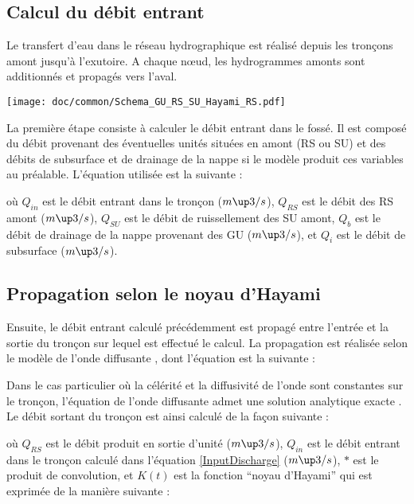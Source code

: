 \subsection{Calcul du débit entrant}
Le transfert d'eau dans le réseau hydrographique est réalisé depuis les tronçons amont jusqu'à l'exutoire. A chaque nœud, les hydrogrammes amonts sont additionnés et propagés vers l’aval.

\texttt{[image: doc/common/Schema\_GU\_RS\_SU\_Hayami\_RS.pdf]}

La première étape consiste à calculer le débit entrant dans le fossé. Il est composé du débit provenant des éventuelles unités situées en amont (RS ou SU) et des débits de subsurface et de drainage de la nappe si le modèle produit ces variables au préalable. L'équation utilisée est la suivante :



où $Q_{in}$ est le débit entrant dans le tronçon ($m\up3/s$), $Q_{RS}$ est le débit des RS amont ($m\up3/s$), $Q_{SU}$ est le débit de ruissellement des SU amont, $Q_b$ est le débit de drainage de la nappe provenant des GU ($m\up3/s$), et $Q_i$ est le débit de subsurface ($m\up3/s$).\\


\subsection{Propagation selon le noyau d'Hayami}
Ensuite, le débit entrant calculé précédemment est propagé entre l'entrée et la sortie du tronçon sur lequel est effectué le calcul. La propagation est réalisée selon le modèle de l'onde diffusante \cite{Moussa1997}, dont l'équation est la suivante :



Dans le cas particulier où la célérité et la diffusivité de l'onde sont constantes sur le tronçon, l’équation de l’onde diffusante admet une solution analytique exacte \cite{Moussa1996}. Le débit sortant du tronçon est ainsi calculé de la façon suivante :



où $Q_{RS}$ est le débit produit en sortie d'unité ($m\up3/s$), $Q_{in}$ est le débit entrant dans le tronçon calculé dans l'équation \ref{InputDischarge} ($m\up3/s$), $*$ est le produit de convolution, et $K(t)$ est la fonction ``noyau d'Hayami'' qui est exprimée de la manière suivante :

